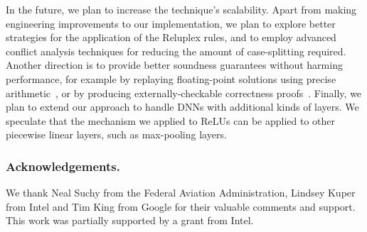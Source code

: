 \documentclass[a4paper]{llncs}
\begin{document}
In the future, we plan to increase the technique's scalability.
 Apart from making engineering improvements to
our implementation, we plan to explore better
strategies for the application of the Reluplex rules,
and to employ advanced conflict analysis techniques for reducing the amount of
case-splitting required. Another direction is to provide better
soundness guarantees without harming performance, for example
by replaying floating-point solutions using 
 precise arithmetic~\cite{KiBaTi14}, or by producing
externally-checkable correctness proofs~\cite{KaBaTiReHa16}.
Finally, we plan to extend our approach to handle DNNs with additional
kinds of layers. We speculate that the mechanism we applied to ReLUs
can be applied to other piecewise linear layers, such as
max-pooling layers.
%


\subsubsection{Acknowledgements.} We thank 
Neal Suchy from the Federal Aviation
Administration, Lindsey Kuper from Intel 
and Tim King from Google for their valuable comments and support.
This work was partially supported by a
 grant from Intel.
\end{document}
